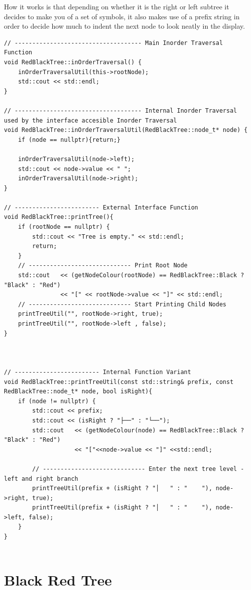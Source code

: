 \documentclass[12pt, a4paper]{report}
\begin{document}
How it works is that depending on whether it is the right or left subtree it decides to make you of a set of symbols, it also makes use of a prefix string in order to decide how much to indent the next node to look neatly in the display.
\begin{verbatim}
// ------------------------------------ Main Inorder Traversal Function
void RedBlackTree::inOrderTraversal() {
    inOrderTraversalUtil(this->rootNode);
    std::cout << std::endl;
}

// ------------------------------------ Internal Inorder Traversal used by the interface accesible Inorder Traversal
void RedBlackTree::inOrderTraversalUtil(RedBlackTree::node_t* node) {
    if (node == nullptr){return;}
    
    inOrderTraversalUtil(node->left);
    std::cout << node->value << " ";
    inOrderTraversalUtil(node->right);
}

// ------------------------ External Interface Function
void RedBlackTree::printTree(){
    if (rootNode == nullptr) {
        std::cout << "Tree is empty." << std::endl;
        return;
    }
    // ----------------------------- Print Root Node
    std::cout   << (getNodeColour(rootNode) == RedBlackTree::Black ? "Black" : "Red") 
                << "[" << rootNode->value << "]" << std::endl;
    // ----------------------------- Start Printing Child Nodes
    printTreeUtil("", rootNode->right, true);
    printTreeUtil("", rootNode->left , false);
}



// ------------------------ Internal Function Variant
void RedBlackTree::printTreeUtil(const std::string& prefix, const RedBlackTree::node_t* node, bool isRight){
    if (node != nullptr) {
        std::cout << prefix;
        std::cout << (isRight ? "├──" : "└──");
        std::cout   << (getNodeColour(node) == RedBlackTree::Black ? "Black" : "Red") 
                    << "["<<node->value << "]" <<std::endl;

        // ----------------------------- Enter the next tree level - left and right branch
        printTreeUtil(prefix + (isRight ? "│   " : "    "), node->right, true);
        printTreeUtil(prefix + (isRight ? "│   " : "    "), node->left, false);
    }
}


\end{verbatim}
\chapter{Black Red Tree}
\end{document}
